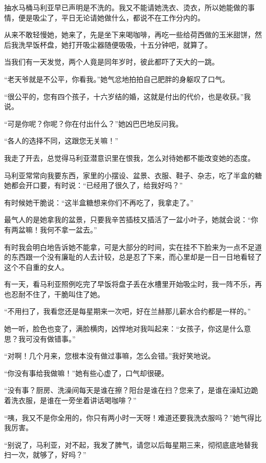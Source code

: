 \par 抽水马桶马利亚早已声明是不洗的。我又不能请她洗衣、烫衣，所以她能做的事情，便是吸尘了，平日无论请她做什么，都说不在工作分内的。
\par 从来不敢轻慢她，她来了，先是坐下来喝咖啡，再吃一些给荷西做的玉米甜饼，然后我洗早饭杯盘，她打开吸尘器随便吸吸，十五分钟吧，就算了。
\par 当我们有一天发觉，两个人竟是同年岁时，彼此都吓了天大的一跳。
\par “老天爷就是不公平，你看我。”她气忿地拍拍自己肥胖的身躯叹了口气。
\par “很公平的，您有四个孩子，十六岁结的婚，这就是付出的代价，也是收获。”我说。
\par “可是你呢？你呢？你在付出什么？”她凶巴巴地反问我。
\par “各人的选择不同，这跟您无关嘛！”
\par 我走了开去，总觉得马利亚潜意识里在恨我，怎么对待她都不能改变她的态度。
\par 马利亚常常向我要东西，家里的小摆设、盆景、衣服、鞋子、杂志，吃了半盒的糖她都会开口要，有时说：“已经用了很久了，给我好吗？”
\par 有时候她干脆说：“这半盒糖想来你们不再吃了，我拿走了。”
\par 最气人的是她拿我的盆景，只要我辛苦插枝又插活了一盆小叶子，她就会说：“你有两盆嘛！我何不拿一盆去。”
\par 有时我会明白地告诉她不能拿，可是大部分的时间，实在挂不下脸来为一点不足道的东西跟一个没有廉耻的人去计较，总是忍了下来，而心里却是一日一日地看轻了这个不自重的女人。
\par 有一天，看马利亚照例吃完了早饭将盘子丢在水槽里开始吸尘时，我一阵不乐，再也忍耐不住了，干脆叫住了她。
\par “不用扫了，我看您还是每星期来一次吧，好在兰赫那儿薪水合约都是一样的。”
\par 她一听，脸色也变了，满脸横肉，凶悍地对我叫起来：“女孩子，你这是什么意思？我可没有做错事。”
\par “对啊！几个月来，您根本没有做过事嘛，怎么会错。”我好笑地说。
\par “你没有事给我做嘛！”她有些心虚了，口气却很硬。
\par “没有事？厨房、洗澡间每天是谁在擦？阳台是谁在扫？您来了，是谁在澡缸边跪着洗衣服，是谁在一旁坐着讲话喝咖啡？”
\par “咦，我又不是你全用的，你只有两小时一天呀！难道还要我洗衣服吗？”她气得比我厉害。
\par “别说了，马利亚，对不起，我发了脾气，请您以后每星期三来，彻彻底底地替我扫一次，就够了，好吗？”
